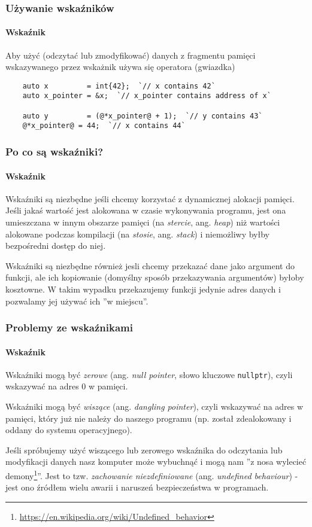 \documentclass[aspectratio=169]{beamer}
\begin{document}
\begin{frame}[fragile]
    \frametitle{Używanie wskaźników}
    \framesubtitle{Wskaźnik}

    Aby użyć (odczytać lub zmodyfikować) danych z fragmentu pamięci wskazywanego
    przez wskażnik używa się operatora {\tt *} (gwiazdka)

    \begin{lstlisting}
    auto x         = int{42};  `// x contains 42`
    auto x_pointer = &x;  `// x_pointer contains address of x`

    auto y         = (@*x_pointer@ + 1);  `// y contains 43`
    @*x_pointer@ = 44;  `// x contains 44`
    \end{lstlisting}
\end{frame}

\begin{frame}
    \frametitle{Po co są wskaźniki?}
    \framesubtitle{Wskaźnik}

    Wskaźniki są niezbędne jeśli chcemy korzystać z dynamicznej alokacji
    pamięci. Jeśli jakaś wartość jest alokowana w czasie wykonywania programu,
    jest ona umieszczana w innym obszarze pamięci (na \emph{stercie}, ang.
    \emph{heap}) niż wartości alokowane podczas kompilacji (na \emph{stosie},
    ang. \emph{stack}) i niemożliwy byłby bezpośredni dostęp do niej.

    \vspace{1em}

    Wskaźniki są niezbędne również jesli chcemy przekazać dane jako argument do
    funkcji, ale ich kopiowanie (domyślny sposób przekazywania argumentów)
    byłoby kosztowne. W takim wypadku przekazujemy funkcji jedynie adres danych
    i pozwalamy jej używać ich ''w miejscu''.
\end{frame}

\begin{frame}
    \frametitle{Problemy ze wskaźnikami}
    \framesubtitle{Wskaźnik}
    \label{what_is_a_dangling_pointer}

    Wskaźniki mogą być \emph{zerowe} (ang. \emph{null pointer}, słowo kluczowe
    {\tt nullptr}), czyli wskazywać na adres 0 w pamięci.

    \vspace{1em}

    Wskaźniki mogą być \emph{wiszące} (ang. \emph{dangling pointer}), czyli
    wskazywać na adres w pamięci, który już nie należy do naszego programu (np.
    został zdealokowany i oddany do systemu operacyjnego).

    \vspace{1em}

    Jeśli spróbujemy użyć wiszącego lub zerowego wskaźnika do odczytania lub
    modyfikacji danych nasz komputer może wybuchnąć i mogą nam ''z nosa
    wylecieć
    demony\footnote{\url{https://en.wikipedia.org/wiki/Undefined_behavior}}''.
    Jest to tzw. \emph{zachowanie niezdefiniowane} (ang. \emph{undefined
    behaviour}) - jest ono źródłem wielu awarii i naruszeń bezpieczeństwa w
    programach.
\end{frame}
\end{document}
